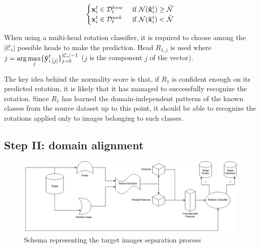 \documentclass[10pt,twocolumn,letterpaper]{article}
\begin{document}
\begin{equation}
  \begin{cases}
    {\bf x}_i^t \in \mathcal{D}_t^{knw} & \text{ if } \mathcal{N}({\bf\tilde x}_i^t) \geq \tilde{\mathcal{N}} \\
    {\bf x}_i^t \in \mathcal{D}_t^{unk} & \text{ if } \mathcal{N}({\bf\tilde x}_i^t) < \tilde{\mathcal{N}}
  \end{cases}
  \label{eq:sample_separation}
\end{equation}

When using a multi-head rotation classifier, 
it is required to choose among the $|\mathcal{C}_s|$ possible heads to make the prediction.
Head $R_{1,j}$ is used where $\displaystyle j = \arg\max_j \{{\bf\hat{y}}_{i, [j]}^t\}_{j=0}^{|\mathcal{C}_s|-1}$
($j$ is the component $j$ of the vector).

The key idea behind the normality score is that, if $R_1$ is confident enough on its predicted rotation,
it is likely that it has managed to successfully recognize the rotation.
Since $R_1$ has learned the domain-independent patterns of the known classes from the source dataset up to this point,
it should be able to recognize the rotations applied only to images belonging to such classes.

\subsection{Step II: domain alignment}
\label{sec:domain_alignment}

\begin{figure}
  \includegraphics[width=\textwidth ]{scheme.png}
  \caption{\label{fig:separation} Schema representing the target images separation process}
\end{figure}
\end{document}
